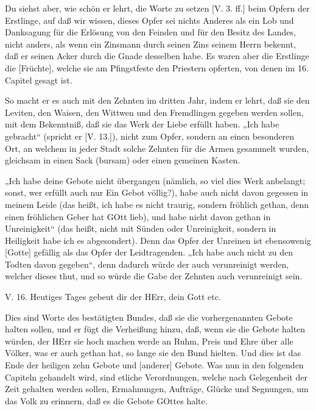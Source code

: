 Du siehst aber, wie schön er lehrt, die Worte zu setzen [V. 3. ff.] beim Opfern der Erstlinge, auf daß wir wissen, dieses Opfer sei nichts Anderes als ein Lob und Danksagung für die Erlösung von den Feinden und für den Besitz des Landes, nicht anders, als wenn ein Zinsmann durch seinen Zins seinem Herrn bekennt, daß er seinen Acker durch die Gnade desselben habe. Es waren aber die Erstlinge die [Früchte],
welche sie am Pfingstfeste den Priestern opferten, von denen im 16. Capitel gesagt ist.

So macht er es auch mit den Zehnten im dritten Jahr, indem er lehrt, daß sie den Leviten, den Waisen, den Wittwen und den Fremdlingen gegeben werden sollen, mit dem Bekenntniß, daß sie das Werk der Liebe erfüllt haben. „Ich habe gebracht“ (spricht er [V. 13.]), nicht zum Opfer, sondern an einen besonderen Ort, an welchem in jeder Stadt solche Zehnten für die Armen gesammelt wurden, gleichsam in einen Sack (bursam) oder einen gemeinen Kasten.

„Ich habe deine Gebote nicht übergangen (nämlich, so viel dies Werk anbelangt; sonst, wer erfüllt auch nur Ein Gebot völlig?), habe auch nicht davon gegessen in meinem Leide (das heißt, ich habe es nicht traurig, sondern fröhlich gethan, denn einen fröhlichen Geber hat GOtt lieb), und habe nicht davon gethan in Unreinigkeit“ (das heißt, nicht mit Sünden oder Unreinigkeit, sondern in Heiligkeit habe ich es abgesondert). Denn das Opfer der Unreinen ist ebensowenig [Gotte] gefällig als das Opfer der Leidtragenden. „Ich habe auch nicht zu den Todten davon gegeben“, denn dadurch würde der auch verunreinigt werden, welcher dieses thut, und so würde die Gabe der Zehnten auch verunreinigt sein.

\begin{schriftzitat}
V. 16. Heutiges Tages gebeut dir der HErr, dein Gott etc.
\end{schriftzitat}

Dies sind Worte des bestätigten Bundes, daß sie die vorhergenannten Gebote halten sollen, und er fügt die Verheißung hinzu, daß, wenn sie die Gebote halten würden, der HErr sie hoch machen werde an Ruhm, Preis und Ehre über alle Völker, was er auch gethan hat, so lange sie den Bund hielten. Und dies ist das Ende der heiligen zehn Gebote und [anderer] Gebote. Was nun in den folgenden Capiteln gehandelt wird, sind etliche Verordnungen, welche nach Gelegenheit der Zeit gehalten werden sollen, Ermahnungen, Aufträge, Glücke und Segnungen, um das Volk zu erinnern, daß es die Gebote GOttes halte.

